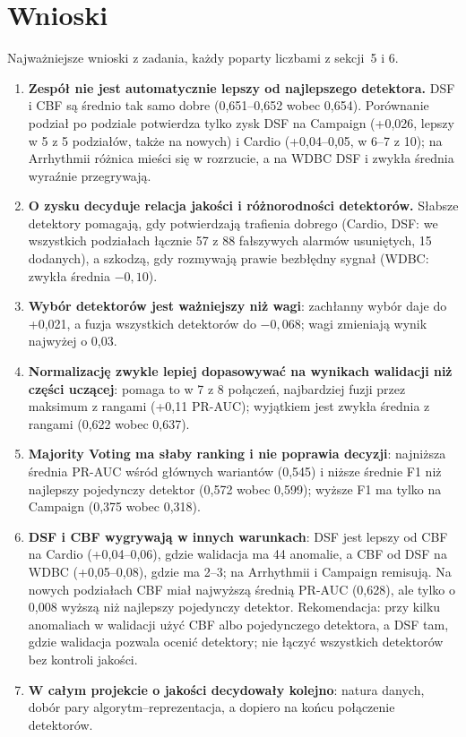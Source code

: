 \documentclass[11pt,a4paper]{article}
\begin{document}
\FloatBarrier
\section{Wnioski}

Najważniejsze wnioski z zadania, każdy poparty liczbami z sekcji~5 i 6.

\begin{enumerate}
  \item \textbf{Zespół nie jest automatycznie lepszy od najlepszego
  detektora.} DSF i CBF są średnio tak samo dobre (0,651--0,652 wobec
  0,654). Porównanie podział po podziale potwierdza tylko zysk DSF na
  Campaign (+0,026, lepszy w 5 z 5 podziałów, także na nowych) i Cardio
  (+0,04--0,05, w 6--7 z 10); na Arrhythmii różnica mieści się w rozrzucie,
  a na WDBC DSF i zwykła średnia wyraźnie przegrywają.
  \item \textbf{O zysku decyduje relacja jakości i różnorodności detektorów.}
  Słabsze detektory pomagają, gdy potwierdzają trafienia dobrego (Cardio,
  DSF: we wszystkich podziałach łącznie 57 z 88 fałszywych alarmów usuniętych,
  15 dodanych), a szkodzą, gdy rozmywają prawie bezbłędny sygnał (WDBC:
  zwykła średnia $-0{,}10$).
  \item \textbf{Wybór detektorów jest ważniejszy niż wagi}: zachłanny wybór
  daje do +0,021, a fuzja wszystkich detektorów do $-0{,}068$; wagi zmieniają
  wynik najwyżej o 0,03.
  \item \textbf{Normalizację zwykle lepiej dopasowywać na wynikach walidacji
  niż części uczącej}: pomaga to w 7 z 8 połączeń, najbardziej fuzji przez
  maksimum z rangami (+0,11 PR-AUC); wyjątkiem jest zwykła średnia z rangami
  (0,622 wobec 0,637).
  \item \textbf{Majority Voting ma słaby ranking i nie poprawia decyzji}:
  najniższa średnia PR-AUC wśród głównych wariantów (0,545) i niższe średnie
  F1 niż najlepszy pojedynczy detektor (0,572 wobec 0,599); wyższe F1 ma tylko
  na Campaign (0,375 wobec 0,318).
  \item \textbf{DSF i CBF wygrywają w innych warunkach}: DSF jest lepszy od
  CBF na Cardio (+0,04--0,06), gdzie walidacja ma 44 anomalie, a CBF od DSF na
  WDBC (+0,05--0,08), gdzie ma 2--3; na Arrhythmii i Campaign remisują.
  Na nowych podziałach CBF miał najwyższą średnią PR-AUC (0,628), ale tylko
  o 0,008 wyższą niż najlepszy pojedynczy detektor. Rekomendacja: przy kilku
  anomaliach w walidacji użyć CBF albo pojedynczego detektora, a DSF tam,
  gdzie walidacja pozwala ocenić detektory; nie łączyć wszystkich detektorów
  bez kontroli jakości.
  \item \textbf{W całym projekcie o jakości decydowały kolejno}: natura
  danych, dobór pary algorytm--reprezentacja, a dopiero na końcu połączenie
  detektorów.
\end{enumerate}
\end{document}
